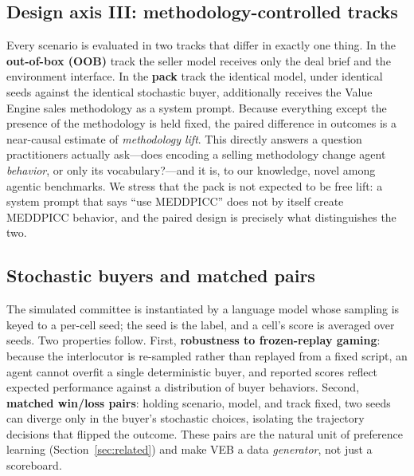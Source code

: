 \subsection{Design axis III: methodology-controlled tracks}
\label{sec:tracks}
Every scenario is evaluated in two tracks that differ in exactly one thing. In
the \textbf{out-of-box (OOB)} track the seller model receives only the deal brief
and the environment interface. In the \textbf{pack} track the identical model,
under identical seeds against the identical stochastic buyer, additionally
receives the Value Engine sales methodology as a system prompt. Because
everything except the presence of the methodology is held fixed, the paired
difference in outcomes is a near-causal estimate of \emph{methodology lift}. This
directly answers a question practitioners actually ask---does encoding a selling
methodology change agent \emph{behavior}, or only its vocabulary?---and it is, to
our knowledge, novel among agentic benchmarks. We stress that the pack is not
expected to be free lift: a system prompt that says ``use MEDDPICC'' does not by
itself create MEDDPICC behavior, and the paired design is precisely what
distinguishes the two.

\subsection{Stochastic buyers and matched pairs}
\label{sec:stochastic}
The simulated committee is instantiated by a language model whose sampling is
keyed to a per-cell seed; the seed is the label, and a cell's score is averaged
over \numSeeds{} seeds. Two properties follow. First, \textbf{robustness to
frozen-replay gaming}: because the interlocutor is re-sampled rather than replayed
from a fixed script, an agent cannot overfit a single deterministic buyer, and
reported scores reflect expected performance against a distribution of buyer
behaviors. Second, \textbf{matched win/loss pairs}: holding scenario, model, and
track fixed, two seeds can diverge only in the buyer's stochastic choices,
isolating the trajectory decisions that flipped the outcome. These pairs are the
natural unit of preference learning (Section~\ref{sec:related}) and make VEB a
data \emph{generator}, not just a scoreboard.
